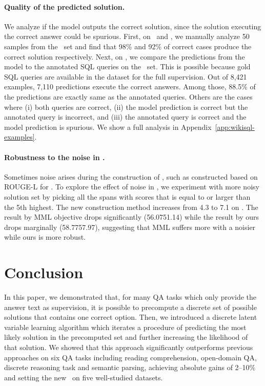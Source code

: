\documentclass[11pt,a4paper]{article}
\begin{document}
\paragraph{Quality of the predicted solution.}

We analyze if the model outputs the correct solution, since the solution executing the correct answer could be spurious.
First, on \narrative\ and \drop, we manually analyze 50 samples from the \dev\ set and find that 98\% and 92\% of correct cases produce the correct solution respectively.
Next, on \wikisql, we compare the predictions from the model to the annotated SQL queries on the \dev\ set. This is possible because gold SQL queries are available in the dataset for the full supervision. Out of 8,421 examples, 7,110 predictions execute the correct answers. Among those, 88.5\% of the predictions are exactly same as the annotated queries. Others are the cases where (i) both queries are correct, (ii) the model prediction is correct but the annotated query is incorrect, and (iii) the annotated query is correct and the model prediction is spurious. We show a full analysis in Appendix~\ref{app:wikisql-examples}.

\paragraph{Robustness to the noise in .}

Sometimes noise arises during the construction of , such as  constructed based on ROUGE-L for \narrative. 
To explore the effect of noise in , we experiment with more noisy solution set by picking all the spans with scores that is equal to or larger than the 5th highest. The new construction method increases  from 4.3 to 7.1 on \narrative.
The result by MML objective drops significantly (56.0751.14) while the result by ours drops marginally (58.7757.97), suggesting that MML suffers more with a noisier  while ours is more robust.
 \section{Conclusion}\label{sec:concl}In this paper, we demonstrated that, for many QA tasks which only provide the answer text as supervision, it is possible to precompute a discrete set of possible solutions that contains one correct option.
Then, we introduced a discrete latent variable learning algorithm which iterates a procedure of predicting the most likely solution in the precomputed set and further increasing the likelihood of that solution.
We showed that this approach significantly outperforms previous approaches on six QA tasks including reading comprehension, open-domain QA, discrete reasoning task and semantic parsing, achieving absolute gains of 2--10\% and setting the new \sota\ on five well-studied datasets.
 
\end{document}

